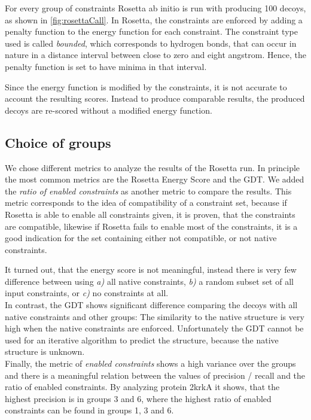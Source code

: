 \documentclass[a4paper, 11pt, parskip=half]{scrartcl}
\begin{document}
For every group of constraints Rosetta ab initio is run with producing 100 decoys, as shown in \autoref{fig:rosettaCall}. In Rosetta, the constraints are enforced by adding a penalty function to the energy function for each constraint. The constraint type used is called \emph{bounded}, which corresponds to hydrogen bonds, that can occur in nature in a distance interval between close to zero and eight angstrom. Hence, the penalty function is set to have minima in that interval.

Since the energy function is modified by the constraints, it is not accurate to account the resulting scores. Instead to produce comparable results, the produced decoys are re-scored without a modified energy function.

\subsection{Choice of groups}
We chose different metrics to analyze the results of the Rosetta run. In principle the most common metrics are the Rosetta Energy Score and the GDT. %
We added the \emph{ratio of enabled constraints} as another metric to compare the results. This metric corresponds to the idea of compatibility of a constraint set, because if Rosetta is able to enable all constraints given, it is proven, that the constraints are compatible, likewise if Rosetta fails to enable most of the constraints, it is a good indication for the set containing either not compatible, or not native constraints.

It turned out, that the energy score is not meaningful, instead there is very few difference between using \emph{a)} all native constraints, \emph{b)} a random subset set of all input constraints, or \emph{c)} no constraints at all.\\
In contrast, the GDT shows significant difference comparing the decoys with all native constraints and other groups: The similarity to the native structure is very high when the native constraints are enforced. Unfortunately the GDT cannot be used for an iterative algorithm to predict the structure, because the native structure is unknown.\\
Finally, the metric of \emph{enabled constraints} shows a high variance over the groups and there is a meaningful relation between the values of precision / recall and the ratio of  enabled constraints. %
By analyzing protein 2krkA it shows, that the highest precision is in groups 3 and 6, where the highest ratio of enabled constraints can be found in groups 1, 3 and 6.
\end{document}

